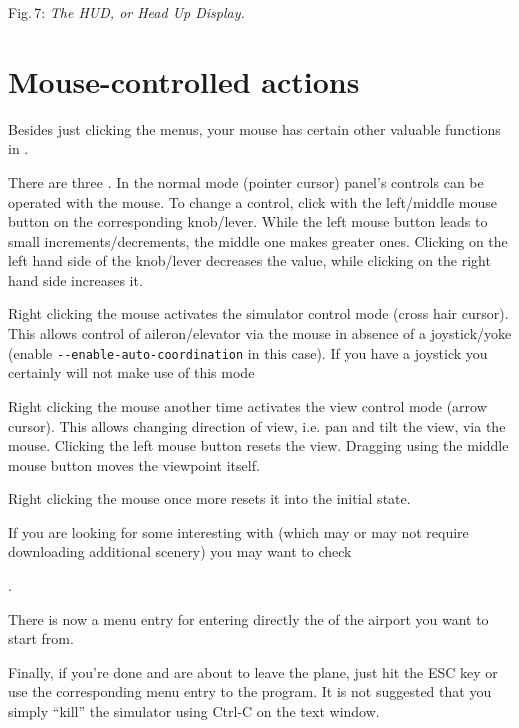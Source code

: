 \smallskip
 \noindent
Fig.\,7: \textit{The HUD, or Head Up Display.}
\medskip

\section{Mouse-controlled actions}

Besides just clicking the menus, your mouse has certain other valuable functions
in \FlightGear{}.


There are three . In the normal mode
(pointer cursor) panel's controls can be operated with the mouse. To
change a control, click with the left/middle mouse button on the
corresponding knob/lever. While the left mouse button leads to small
increments/decrements, the middle one makes greater ones. Clicking on
the left hand side of the knob/lever decreases the value, while
clicking on the right hand side increases it.

 Right clicking the mouse activates the simulator control mode (cross
 hair cursor). This allows control of aileron/elevator via the mouse in
 absence of a joystick/yoke (enable \texttt{-$
 $-enable-auto-coordination} in this case). If you have a joystick you
 certainly will not make use of this mode

 Right clicking the mouse another time activates the view control mode (arrow
cursor).
 This allows changing direction of view, i.e. pan and tilt the view, via the
mouse.
 Clicking the left mouse button resets the view.
 Dragging using the middle mouse button moves the viewpoint itself.

 Right clicking the mouse once more resets it into the initial state.

If you are looking for some interesting  with
\FlightGear{}
(which may or may not require downloading additional scenery) you may want to
check
 \medskip

 .
  \medskip

\noindent
 There is now a menu entry for entering directly the  of the
airport you want to start from.

Finally, if you're done and are about to leave the plane, just hit the ESC key
or use the
corresponding menu entry to  the program. It is not suggested that
you simply
``kill'' the simulator using Ctrl-C on the text window.



